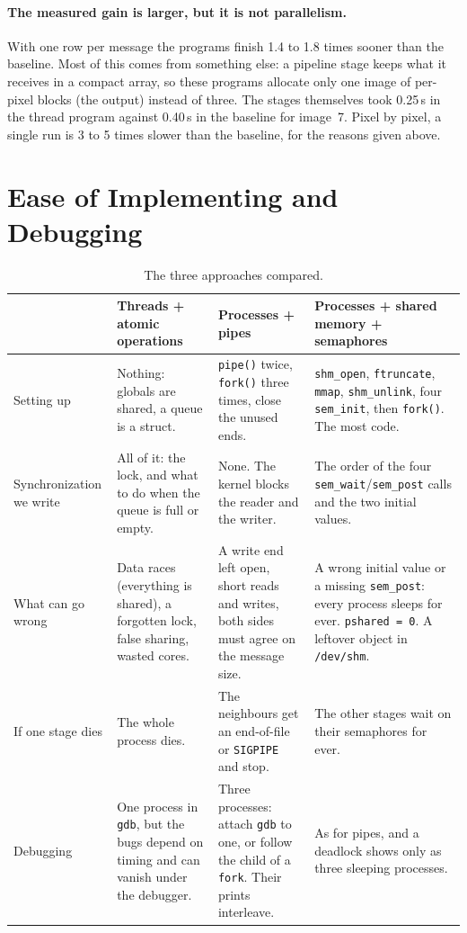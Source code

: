 \documentclass[11pt,a4paper]{article}
\begin{document}
\paragraph{The measured gain is larger, but it is not parallelism.} With one row per message the
programs finish 1.4 to 1.8 times sooner than the baseline. Most of this comes from something else:
a pipeline stage keeps what it receives in a compact array, so these programs allocate only one
image of per-pixel blocks (the output) instead of three. The stages themselves
took 0.25\,s in the thread program against 0.40\,s in the baseline for image~7. Pixel by pixel, a
single run is 3 to 5 times slower than the baseline, for the reasons given above.

\section{Ease of Implementing and Debugging}

\begin{table}[H]
\centering\small
\setlength{\tabcolsep}{4pt}
\renewcommand{\arraystretch}{1.15}
\begin{tabular}{@{}p{2.5cm}p{4.2cm}p{4.2cm}p{4.6cm}@{}}
\toprule
& Threads + atomic operations & Processes + pipes & Processes + shared memory + semaphores \\
\midrule
Setting up &
Nothing: globals are shared, a queue is a struct. &
\texttt{pipe()} twice, \texttt{fork()} three times, close the unused ends. &
\texttt{shm\_open}, \texttt{ftruncate}, \texttt{mmap}, \texttt{shm\_unlink}, four \texttt{sem\_init}, then \texttt{fork()}. The most code. \\
Synchronization we write &
All of it: the lock, and what to do when the queue is full or empty. &
None. The kernel blocks the reader and the writer. &
The order of the four \texttt{sem\_wait}/\texttt{sem\_post} calls and the two initial values. \\
What can go wrong &
Data races (everything is shared), a forgotten lock, false sharing, wasted cores. &
A write end left open, short reads and writes, both sides must agree on the message size. &
A wrong initial value or a missing \texttt{sem\_post}: every process sleeps for ever. \texttt{pshared = 0}. A leftover object in \texttt{/dev/shm}. \\
If one stage dies &
The whole process dies. &
The neighbours get an end-of-file or \texttt{SIGPIPE} and stop. &
The other stages wait on their semaphores for ever. \\
Debugging &
One process in \texttt{gdb}, but the bugs depend on timing and can vanish under the debugger. &
Three processes: attach \texttt{gdb} to one, or follow the child of a \texttt{fork}. Their prints interleave. &
As for pipes, and a deadlock shows only as three sleeping processes. \\
\bottomrule
\end{tabular}
\caption{The three approaches compared.}
\label{tab:ease}
\end{table}
\end{document}
